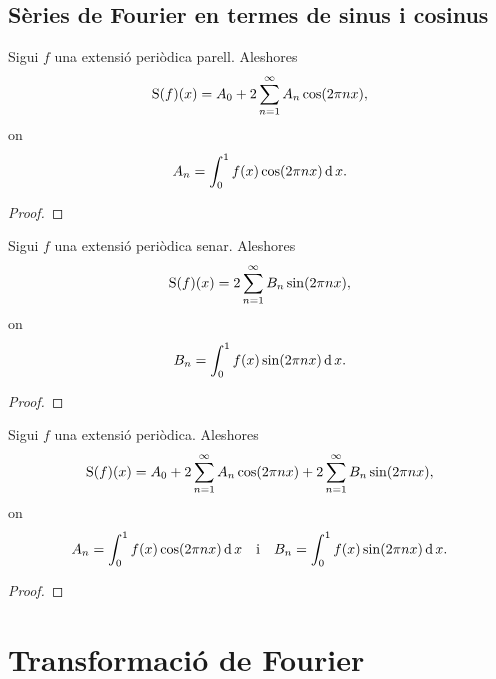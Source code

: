 \documentclass[../../Main.tex]{subfiles}
\begin{document}
	\subsection{Sèries de Fourier en termes de sinus i cosinus}
	\begin{proposition}
		\label{prop:sèrie de Fourier d'una funció parell}
		Sigui \(f\) una extensió periòdica parell. Aleshores
		\[\operatorname{S}(f)(x)=A_{0}+2\sum_{n=1}^{\infty}A_{n}\cos(2\pi nx),\]
		on
		\[A_{n}=\int_{0}^{1}f(x)\cos(2\pi nx)\operatorname{d} x.\] %
		\begin{proof}
		\end{proof}
	\end{proposition}
	\begin{proposition}
		\label{prop:sèrie de Fourier d'una funció senar}
		Sigui \(f\) una extensió periòdica senar. Aleshores
		\[\operatorname{S}(f)(x)=2\sum_{n=1}^{\infty}B_{n}\sin(2\pi nx),\]
		on
		\[B_{n}=\int_{0}^{1}f(x)\sin(2\pi nx)\operatorname{d} x.\]
		\begin{proof}
		\end{proof}
	\end{proposition}
	\begin{theorem}
		Sigui \(f\) una extensió periòdica. Aleshores
		\[\operatorname{S}(f)(x)=A_{0}+2\sum_{n=1}^{\infty}A_{n}\cos(2\pi nx)+2\sum_{n=1}^{\infty}B_{n}\sin(2\pi nx),\]
		on
		\[A_{n}=\int_{0}^{1}f(x)\cos(2\pi nx)\operatorname{d} x\quad\text{i}\quad B_{n}=\int_{0}^{1}f(x)\sin(2\pi nx)\operatorname{d} x.\]
		\begin{proof}
		\end{proof}
	\end{theorem}
\section{Transformació de Fourier}
\end{document}
